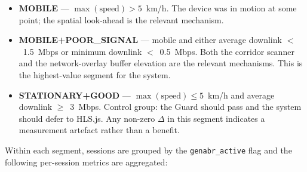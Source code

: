 \documentclass[conference]{IEEEtran}
\begin{document}
\begin{itemize}
  \item \textbf{MOBILE} --- $\max(\text{speed}) > 5$~km/h. The device
        was in motion at some point; the spatial look-ahead is the
        relevant mechanism.
  \item \textbf{MOBILE+POOR\_SIGNAL} --- mobile and either average
        downlink $<$~1.5~Mbps or minimum downlink $<$~0.5~Mbps. Both
        the corridor scanner and the network-overlay buffer elevation
        are the relevant mechanisms. This is the highest-value segment
        for the system.
  \item \textbf{STATIONARY+GOOD} --- $\max(\text{speed}) \leq 5$~km/h
        and average downlink $\geq$~3~Mbps. Control group: the Guard
        should pass and the system should defer to HLS.js. Any
        non-zero $\Delta$ in this segment indicates a measurement
        artefact rather than a benefit.
\end{itemize}

Within each segment, sessions are grouped by the
\texttt{genabr\_active} flag and the following per-session metrics are
aggregated:
\end{document}
